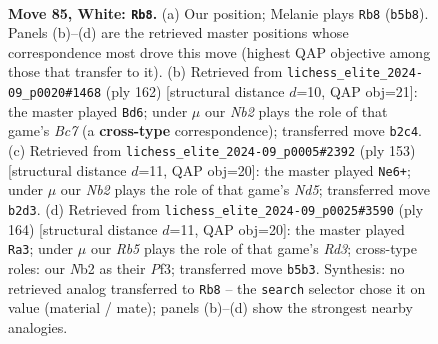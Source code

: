 \documentclass[11pt]{article}
\begin{document}
\clearpage

\begin{figure}[p]\centering
\begin{subfigure}{0.46\textwidth}\centering
\resizebox{\linewidth}{!}{%
\newchessgame
\chessboard[
  setfen={8/8/k4K2/1R6/3r4/8/1N4P1/8 w - - 34 85},
  showmover=false,
  pgfstyle=straightmove, color=movearrow, markmove={b5-b8}
]}
\caption{}
\end{subfigure}\hfill
\begin{subfigure}{0.46\textwidth}\centering
\resizebox{\linewidth}{!}{%
\newchessgame
\chessboard[
  setfen={5k2/2B1R3/2p5/6K1/8/3r4/8/8 w - - 1 82},
  showmover=false,
  pgfstyle=straightmove, color=movearrow, markmove={c7-d6}
]}
\caption{}
\end{subfigure}
\\[4pt]
\begin{subfigure}{0.46\textwidth}\centering
\resizebox{\linewidth}{!}{%
\newchessgame
\chessboard[
  setfen={8/2K1k3/3r4/8/3n4/8/8/8 b - - 6 77},
  showmover=false,
  pgfstyle=straightmove, color=movearrow, markmove={d4-e6}
]}
\caption{}
\end{subfigure}\hfill
\begin{subfigure}{0.46\textwidth}\centering
\resizebox{\linewidth}{!}{%
\newchessgame
\chessboard[
  setfen={5r2/8/8/6K1/2k5/3R1P2/8/8 w - - 1 83},
  showmover=false,
  pgfstyle=straightmove, color=movearrow, markmove={d3-a3}
]}
\caption{}
\end{subfigure}
\caption{\textbf{Move 85, White: \texttt{Rb8}.} (a) Our position; Melanie plays \texttt{Rb8} (\texttt{b5b8}). Panels (b)--(d) are the retrieved master positions whose correspondence most drove this move (highest QAP objective among those that transfer to it). (b) Retrieved from \texttt{lichess\_elite\_2024-09\_p0020\#1468} (ply 162) [structural distance $d$=10, QAP obj=21]: the master played \texttt{Bd6}; under $\mu$ our \emph{Nb2} plays the role of that game's \emph{Bc7} (a \textbf{cross-type} correspondence); transferred move \texttt{b2c4}. (c) Retrieved from \texttt{lichess\_elite\_2024-09\_p0005\#2392} (ply 153) [structural distance $d$=11, QAP obj=20]: the master played \texttt{Ne6+}; under $\mu$ our \emph{Nb2} plays the role of that game's \emph{Nd5}; transferred move \texttt{b2d3}. (d) Retrieved from \texttt{lichess\_elite\_2024-09\_p0025\#3590} (ply 164) [structural distance $d$=11, QAP obj=20]: the master played \texttt{Ra3}; under $\mu$ our \emph{Rb5} plays the role of that game's \emph{Rd3}; cross-type roles: our \emph{N}b2 as their \emph{P}f3; transferred move \texttt{b5b3}. Synthesis: no retrieved analog transferred to \texttt{Rb8} -- the \texttt{search} selector chose it on value (material / mate); panels (b)--(d) show the strongest nearby analogies.}
\label{fig:thought-m168}
\end{figure}
\end{document}
